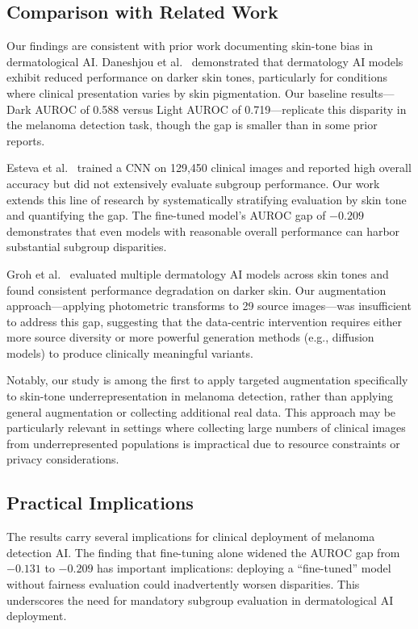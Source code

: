 \subsection{Comparison with Related Work}

Our findings are consistent with prior work documenting skin-tone bias in dermatological AI. Daneshjou et al.~\cite{Daneshjou2022} demonstrated that dermatology AI models exhibit reduced performance on darker skin tones, particularly for conditions where clinical presentation varies by skin pigmentation. Our baseline results---Dark AUROC of 0.588 versus Light AUROC of 0.719---replicate this disparity in the melanoma detection task, though the gap is smaller than in some prior reports.

Esteva et al.~\cite{Esteva2017} trained a CNN on 129,450 clinical images and reported high overall accuracy but did not extensively evaluate subgroup performance. Our work extends this line of research by systematically stratifying evaluation by skin tone and quantifying the gap. The fine-tuned model's AUROC gap of $-0.209$ demonstrates that even models with reasonable overall performance can harbor substantial subgroup disparities.

Groh et al.~\cite{Groh2021} evaluated multiple dermatology AI models across skin tones and found consistent performance degradation on darker skin. Our augmentation approach---applying photometric transforms to 29 source images---was insufficient to address this gap, suggesting that the data-centric intervention requires either more source diversity or more powerful generation methods (e.g., diffusion models) to produce clinically meaningful variants.

Notably, our study is among the first to apply targeted augmentation specifically to skin-tone underrepresentation in melanoma detection, rather than applying general augmentation or collecting additional real data. This approach may be particularly relevant in settings where collecting large numbers of clinical images from underrepresented populations is impractical due to resource constraints or privacy considerations.

\subsection{Practical Implications}

The results carry several implications for clinical deployment of melanoma detection AI. The finding that fine-tuning alone widened the AUROC gap from $-0.131$ to $-0.209$ has important implications: deploying a ``fine-tuned'' model without fairness evaluation could inadvertently worsen disparities. This underscores the need for mandatory subgroup evaluation in dermatological AI deployment.

